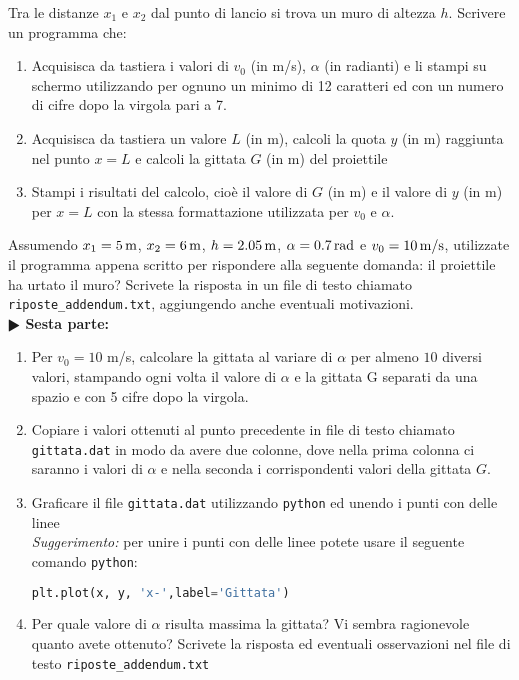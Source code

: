 \documentclass[11pt]{article}
\begin{document}
Tra le distanze $x_1$ e $x_2$ dal punto di lancio si trova un muro di altezza $h$.
Scrivere un programma che:
\begin{enumerate}
  \item Acquisisca da tastiera i valori di $v_0$ (in m/s), $\alpha$ (in radianti) e li stampi su schermo utilizzando per ognuno un minimo di 12 caratteri ed con un numero di cifre dopo la virgola pari a 7. 
  \item Acquisisca da tastiera un valore $L$ (in m), calcoli la quota $y$ (in m) raggiunta nel punto $x = L$ e
    calcoli la gittata $G$ (in m) del proiettile
  \item Stampi i risultati del calcolo, cioè il valore di $G$ (in m) e il valore di $y$ (in m) per $x=L$ 
        con la stessa formattazione utilizzata per $v_0$ e $\alpha$.
\end{enumerate}
Assumendo $x_1=5\,\hbox{m}$, $x_2=6\,\hbox{m}$, $h=2.05\,\hbox{m}$, $\alpha=0.7\,\hbox{rad}$ e $v_0=10\,\hbox{m/s}$,
utilizzate il programma appena scritto per rispondere alla seguente domanda: il proiettile ha urtato il muro? 
Scrivete la risposta in un file di testo chiamato \texttt{riposte\_addendum.txt}, aggiungendo anche eventuali motivazioni.
\vspace{3mm} \\
\textbf{$\RHD$ Sesta parte:} 
\begin{enumerate}
  \item Per $v_0=10$ m/s, calcolare la gittata al variare di $\alpha$ per almeno $10$ diversi valori, stampando 
   ogni volta il valore di $\alpha$ e la gittata G separati da una spazio e con 5 cifre dopo la virgola.
  
 \item Copiare i valori ottenuti al punto precedente in file di testo chiamato \texttt{gittata.dat} 
     in modo da avere due colonne, dove nella prima colonna ci saranno i valori di $\alpha$ 
      e nella seconda i corrispondenti valori della gittata $G$.

    \item Graficare il file \texttt{gittata.dat} utilizzando \texttt{python} ed unendo i punti con delle linee \\
      {\em Suggerimento:\/} per unire i punti con delle linee potete usare il seguente comando \texttt{python}:
    \vspace{0.2cm}
\begin{lstlisting}[language=Python,numbers=none]
  plt.plot(x, y, 'x-',label='Gittata')
\end{lstlisting}
 \item Per quale valore di $\alpha$ risulta massima la gittata? Vi sembra ragionevole quanto avete ottenuto?
      Scrivete la risposta ed eventuali osservazioni nel file di testo \texttt{riposte\_addendum.txt}
\end{enumerate}  
\end{document}
